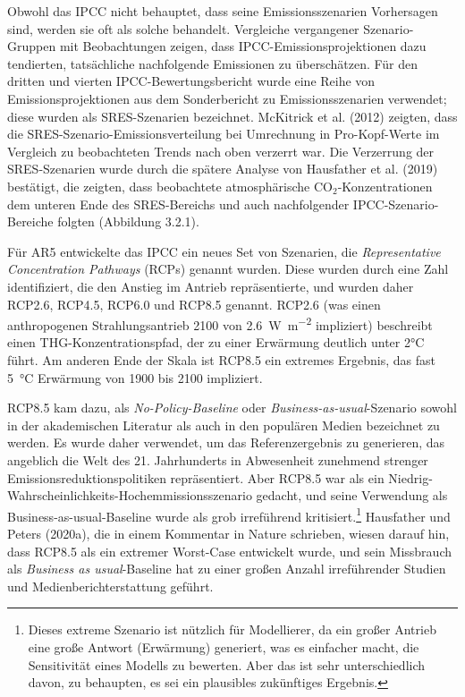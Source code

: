 \documentclass[12pt,paper=a4,DIV=12,parskip=never,chapterprefix=false,headings=standardclasses]{scrreprt}
\begin{document}
Obwohl das IPCC nicht behauptet, dass seine Emissionsszenarien Vorhersagen sind, werden sie oft als solche behandelt. Vergleiche vergangener Szenario-Gruppen mit Beobachtungen zeigen, dass IPCC-Emissionsprojektionen dazu tendierten, tatsächliche nachfolgende Emissionen zu überschätzen. Für den dritten und vierten IPCC-Bewertungsbericht wurde eine Reihe von Emissionsprojektionen aus dem Sonderbericht zu Emissionsszenarien verwendet; diese wurden als SRES-Szenarien bezeichnet. McKitrick et al. (2012) zeigten, dass die SRES-Szenario-Emissionsverteilung bei Umrechnung in Pro-Kopf-Werte im Vergleich zu beobachteten Trends nach oben verzerrt war. Die Verzerrung der SRES-Szenarien wurde durch die spätere Analyse von Hausfather et al. (2019) bestätigt, die zeigten, dass beobachtete atmosphärische CO$_2$-Konzentrationen dem unteren Ende des SRES-Bereichs und auch nachfolgender IPCC-Szenario-Bereiche folgten (Abbildung 3.2.1).

Für AR5 entwickelte das IPCC ein neues Set von Szenarien, die \emph{Representative Concentration Pathways} (RCPs) genannt wurden. Diese wurden durch eine Zahl identifiziert, die den Anstieg im Antrieb repräsentierte, und wurden daher RCP2.6, RCP4.5, RCP6.0 und RCP8.5 genannt. RCP2.6 (was einen anthropogenen Strahlungsantrieb 2100 von \SI{2.6}{\watt\per\square\meter} impliziert) beschreibt einen THG-Konzentrationspfad, der zu einer Erwärmung deutlich unter 2°C führt. Am anderen Ende der Skala ist RCP8.5 ein extremes Ergebnis, das fast \SI{5}{\celsius} Erwärmung von 1900 bis 2100 impliziert.

RCP8.5 kam dazu, als \emph{No-Policy-Baseline} oder \emph{Business-as-usual}-Szenario sowohl in der akademischen Literatur als auch in den populären Medien bezeichnet zu werden. Es wurde daher verwendet, um das Referenzergebnis zu generieren, das angeblich die Welt des 21. Jahrhunderts in Abwesenheit zunehmend strenger Emissionsreduktionspolitiken repräsentiert. Aber RCP8.5 war als ein Niedrig-Wahrscheinlichkeits-Hochemmissionsszenario gedacht, und seine Verwendung als Business-as-usual-Baseline wurde als grob irreführend kritisiert.\footnote{Dieses extreme Szenario ist nützlich für Modellierer, da ein großer Antrieb eine große Antwort (Erwärmung) generiert, was es einfacher macht, die Sensitivität eines Modells zu bewerten. Aber das ist sehr unterschiedlich davon, zu behaupten, es sei ein plausibles zukünftiges Ergebnis.} Hausfather und Peters (2020a), die in einem Kommentar in Nature schrieben, wiesen darauf hin, dass RCP8.5 als ein extremer Worst-Case entwickelt wurde, und sein Missbrauch als \emph{Business as usual}-Baseline hat zu einer großen Anzahl irreführender Studien und Medienberichterstattung geführt.
\end{document}
